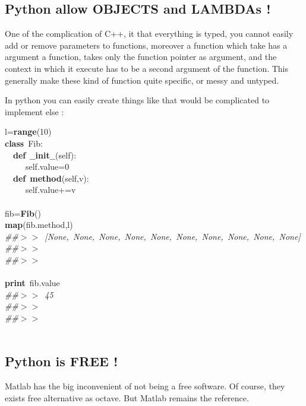 \documentclass{report}
\begin{document}
\subsection{Python allow OBJECTS and LAMBDAs !}
One of the complication of C++, it that everything is typed, you cannot easily add or remove parameters to functions, 
moreover a function which take has a argument a function, takes only the function pointer as argument, 
and the context in which it execute has to be a second argument of the function.
This generally make these kind of function quite specific, or messy and untyped.

In python you can easily create things like that would be complicated to implement else :





\begin{minipage}{\textwidth}
{\small
\noindent
\mbox{}l=\textbf{range}(10) \\
\mbox{}\textbf{class}\ Fib: \\
\mbox{}\ \ \textbf{def}\ \textbf{$\_$$\_$init$\_$$\_$}(self): \\
\mbox{}\ \ \ \ \ self.value=0 \\
\mbox{}\ \ \textbf{def}\ \textbf{method}(self,v): \\
\mbox{}\ \ \ \ \ self.value+=v \\
\mbox{} \\
\mbox{}fib=\textbf{Fib}() \\
\mbox{}\textbf{map}(fib.method,l) \\
\mbox{}\textit{\#\#$>$$>$\ [None,\ None,\ None,\ None,\ None,\ None,\ None,\ None,\ None,\ None]} \\
\mbox{}\textit{\#\#$>$$>$\ } \\
\mbox{}\textit{\#\#$>$$>$\ } \\
\mbox{} \\
\mbox{}\textbf{print}\ fib.value \\
\mbox{}\textit{\#\#$>$$>$\ 45} \\
\mbox{}\textit{\#\#$>$$>$\ } \\
\mbox{}\textit{\#\#$>$$>$\ } \\
\mbox{} \\
\mbox{}
}
\end{minipage}





\subsection{Python is FREE !}
 Matlab has the big inconvenient of not being a free software. Of course, they exists free alternative as octave.
 But Matlab remains the reference.
\end{document}
